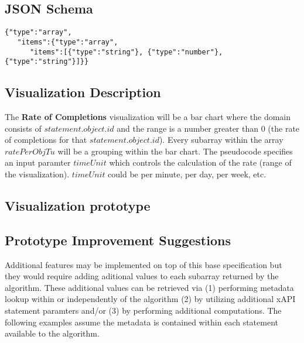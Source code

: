\documentclass{article}
\begin{document}
\subsection{JSON Schema}

\begin{lstlisting}[style=json]
{"type":"array",
   "items":{"type":"array",
      "items":[{"type":"string"}, {"type":"number"}, {"type":"string"}]}}
\end{lstlisting}

\subsection{Visualization Description}

The \textbf{Rate of Completions} visualization will be
a bar chart where the domain consists of $statement.object.id$ and the
range is a number greater than 0 (the rate of completions for that
$statement.object.id$). Every subarray within the array $ratePerObjTu$
will be a grouping within the bar chart. The pseudocode specifies an
input paramter $timeUnit$ which controls the calculation of the rate
(range of the visualization). $timeUnit$ could be per minute, per day,
per week, etc.

\subsection{Visualization prototype}



\subsection{Prototype Improvement Suggestions}
Additional features may be implemented on top of this base
specification but they would require adding aditional values to each
subarray returned by the algorithm. These additional values can be
retrieved via (1) performing metadata lookup within or independently of the
algorithm (2) by utilizing additional xAPI statement paramters and/or (3) by
performing additional computations. The following examples assume the
metadata is contained within each statement available to the algorithm.
\end{document}
